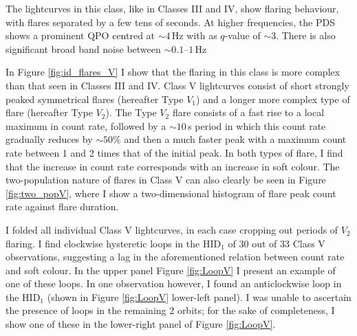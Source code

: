 \par The lightcurves in this class, like in Classes III and IV, show flaring behaviour, with flares separated by a few tens of seconds.  At higher frequencies, the PDS shows a prominent QPO centred at $\sim4$\,Hz with as $q$-value of $\sim3$.  There is also significant broad band noise between $\sim0.1$--$1$\,Hz
\par In Figure \ref{fig:id_flares_V} I show that the flaring in this class is more complex than that seen in Classes III and IV.  Class V lightcurves consist of short strongly peaked symmetrical flares (hereafter Type $V_1$) and a longer more complex type of flare (hereafter Type $V_2$).  The Type $V_2$ flare consists of a fast rise to a local maximum in count rate, followed by a $\sim10$\,s period in which this count rate gradually reduces by $\sim50\%$ and then a much faster peak with a maximum count rate between 1 and 2 times that of the initial peak.  In both types of flare, I find that the increase in count rate corresponds with an increase in soft colour.  The two-population nature of flares in Class V can also clearly be seen in Figure \ref{fig:two_popV}, where I show a two-dimensional histogram of flare peak count rate against flare duration.
\par I folded all individual Class V lightcurves, in each case cropping out periods of $V_2$ flaring.  I find clockwise hysteretic loops in the HID$_1$ of 30 out of 33 Class V observations, suggesting a lag in the aforementioned relation between count rate and soft colour.  In the upper panel Figure \ref{fig:LoopV} I present an example of one of these loops.  In one observation however, I found an anticlockwise loop in the HID$_1$ (shown in Figure \ref{fig:LoopV} lower-left panel).  I was unable to ascertain the presence of loops in the remaining 2 orbits; for the sake of completeness, I show one of these in the lower-right panel of Figure \ref{fig:LoopV}.

